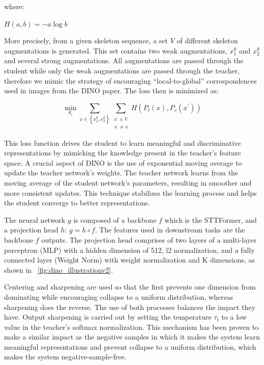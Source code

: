 where:

\begin{center}
$H(a, b)=-a \log b$
\end{center}

More precisely, from a given skeleton sequence, a set $V$ of different skeleton augmentations is generated. This set contains two weak augmentations, $x^g_1$ and $x^g_2$ and several strong augmentations. All augmentations are passed through the student while only the weak augmentations are passed through the teacher, therefore we mimic the strategy of encouraging “local-to-global” correspondences used in images from the DINO paper. The loss then is minimized as:

$$
\min _{\theta_s} \sum_{x \in\left\{x_1^g, x_2^g\right\}} \sum_{\substack{x^{\prime} \in V \\ x^{\prime} \neq x}} H\left(P_t(x), P_s\left(x^{\prime}\right)\right)
$$

This loss function drives the student to learn meaningful and discriminative representations by mimicking the knowledge present in the teacher's feature space. A crucial aspect of DINO is the use of exponential moving average to update the teacher network's weights. The teacher network learns from the moving average of the student network's parameters, resulting in smoother and more consistent updates. This technique stabilizes the learning process and helps the student converge to better representations. 

The neural network $g$ is composed of a backbone $f$ which is the STTFormer, and a projection head $h$: $g=h\circ f$. The features used in downstream tasks are the backbone $f$ outputs. The projection head comprises of two layers of a multi-layer perceptron (MLP) with a hidden dimension of 512, l2 normalization, and a fully connected layer (Weight Norm) with weight normalization and K dimensions, as shown in ~\ref{fig:dino_illustrationv2}.

Centering and sharpening are used so that the first prevents one dimension from dominating while encouraging collapse to a uniform distribution, whereas sharpening does the reverse. The use of both processes balances the impact they have. Output sharpening is carried out by setting the temperature $\tau_t$ to a low value in the teacher's softmax normalization. This mechanism has been proven to make a similar impact as the negative samples in which it makes the system learn meaningful representations and prevent collapse to a uniform distribution, which makes the system negative-sample-free. 

